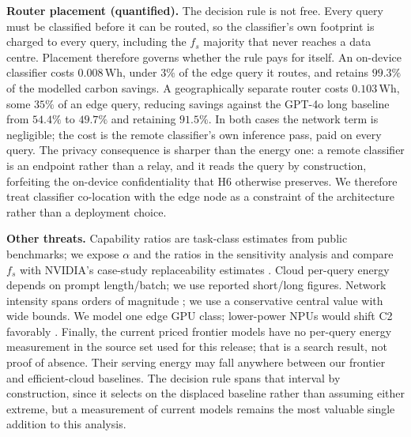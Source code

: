 \documentclass[conference]{IEEEtran}
\newcommand{\Wh}{\,\text{Wh}}
\newcommand{\fs}{f_{s}}
\begin{document}
\textbf{Router placement (quantified).} The decision rule is not free. Every
query must be classified before it can be routed, so the classifier's own
footprint is charged to every query, including the $\fs$ majority that never
reaches a data centre. Placement therefore governs whether the rule pays for
itself. An on-device classifier costs $0.008\Wh$, under $3\%$ of the edge query
it routes, and retains $99.3\%$ of the modelled carbon savings. A
geographically separate router costs $0.103\Wh$, some $35\%$ of an edge query,
reducing savings against the GPT-4o long baseline from $54.4\%$ to $49.7\%$ and
retaining $91.5\%$. In both cases the network term is negligible; the cost is
the remote classifier's own inference pass, paid on every query. The privacy
consequence is sharper than the energy one: a remote classifier is an endpoint
rather than a relay, and it reads the query by construction, forfeiting the
on-device confidentiality that H6 otherwise preserves. We therefore treat
classifier co-location with the edge node as a constraint of the architecture
rather than a deployment choice.

\textbf{Other threats.} Capability ratios are task-class estimates from public
benchmarks; we expose $\alpha$ and the ratios in the sensitivity analysis and
compare $\fs$ with NVIDIA's case-study replaceability estimates \cite{belcak2025}. Cloud
per-query energy depends on prompt length/batch; we use reported short/long
figures. Network intensity spans orders of magnitude \cite{aslan2018}; we use a
conservative central value with wide bounds. We model one edge GPU class;
lower-power NPUs would shift C2 favorably \cite{techtarget2025}. Finally, the
current priced frontier models have no per-query energy measurement in the
source set used for this release; that is a search result, not proof of absence.
Their serving energy may fall anywhere between our frontier and efficient-cloud
baselines. The decision rule spans that interval by construction, since it
selects on the displaced baseline rather than assuming either extreme, but a
measurement of current models remains the most valuable single addition to this
analysis.
\end{document}
